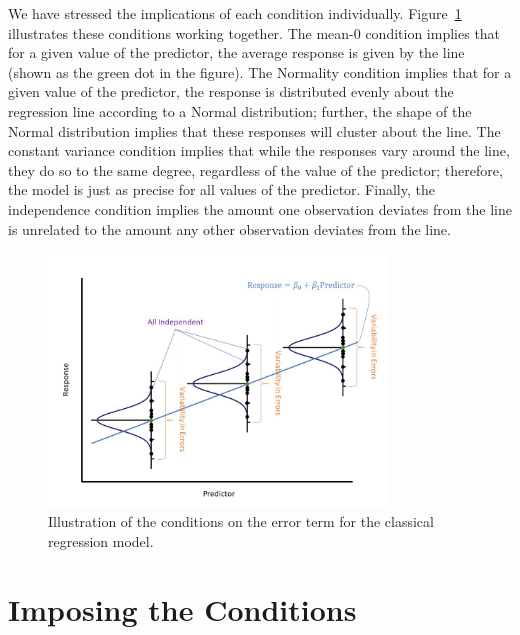 \documentclass[
  letterpaper,
  DIV=11,
  numbers=noendperiod]{scrreprt}
\theoremstyle{plain}
\theoremstyle{definition}
\theoremstyle{definition}
\theoremstyle{remark}
\begin{document}
We have stressed the implications of each condition individually.
Figure~\ref{fig-regconditions-assumptions} illustrates these conditions
working together. The mean-0 condition implies that for a given value of
the predictor, the average response is given by the line (shown as the
green dot in the figure). The Normality condition implies that for a
given value of the predictor, the response is distributed evenly about
the regression line according to a Normal distribution; further, the
shape of the Normal distribution implies that these responses will
cluster about the line. The constant variance condition implies that
while the responses vary around the line, they do so to the same degree,
regardless of the value of the predictor; therefore, the model is just
as precise for all values of the predictor. Finally, the independence
condition implies the amount one observation deviates from the line is
unrelated to the amount any other observation deviates from the line.

\begin{figure}

{\centering \includegraphics[width=0.8\textwidth,height=\textheight]{./images/RegConditions-Assumptions.jpg}

}

\caption{\label{fig-regconditions-assumptions}Illustration of the
conditions on the error term for the classical regression model.}

\end{figure}

\hypertarget{imposing-the-conditions}{%
\section{Imposing the Conditions}\label{imposing-the-conditions}}
\end{document}
